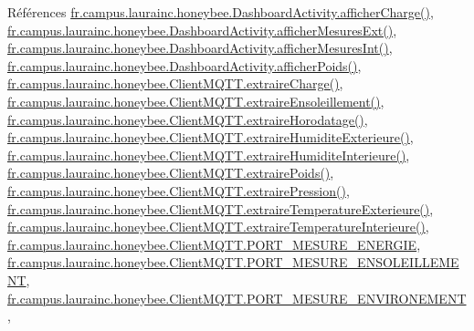 Références \hyperlink{classfr_1_1campus_1_1laurainc_1_1honeybee_1_1_dashboard_activity_a13e1d8016723e33b6245e9e3063c8a4f}{fr.\+campus.\+laurainc.\+honeybee.\+Dashboard\+Activity.\+afficher\+Charge()}, \hyperlink{classfr_1_1campus_1_1laurainc_1_1honeybee_1_1_dashboard_activity_afffb9de4776b6c6cea676a08251a58ba}{fr.\+campus.\+laurainc.\+honeybee.\+Dashboard\+Activity.\+afficher\+Mesures\+Ext()}, \hyperlink{classfr_1_1campus_1_1laurainc_1_1honeybee_1_1_dashboard_activity_aa177b8212619dec95e0a8eae4dbc867d}{fr.\+campus.\+laurainc.\+honeybee.\+Dashboard\+Activity.\+afficher\+Mesures\+Int()}, \hyperlink{classfr_1_1campus_1_1laurainc_1_1honeybee_1_1_dashboard_activity_a13786896440cb102e03bd5ac4f54c3d8}{fr.\+campus.\+laurainc.\+honeybee.\+Dashboard\+Activity.\+afficher\+Poids()}, \hyperlink{classfr_1_1campus_1_1laurainc_1_1honeybee_1_1_client_m_q_t_t_a93572795db92f79f417982f4785b71e0}{fr.\+campus.\+laurainc.\+honeybee.\+Client\+M\+Q\+T\+T.\+extraire\+Charge()}, \hyperlink{classfr_1_1campus_1_1laurainc_1_1honeybee_1_1_client_m_q_t_t_a38a76fc07a1793ba1a94898bdcd5ecbd}{fr.\+campus.\+laurainc.\+honeybee.\+Client\+M\+Q\+T\+T.\+extraire\+Ensoleillement()}, \hyperlink{classfr_1_1campus_1_1laurainc_1_1honeybee_1_1_client_m_q_t_t_ace17d633909a5be8035518b9a6b528c2}{fr.\+campus.\+laurainc.\+honeybee.\+Client\+M\+Q\+T\+T.\+extraire\+Horodatage()}, \hyperlink{classfr_1_1campus_1_1laurainc_1_1honeybee_1_1_client_m_q_t_t_a0a3be0588498643af9098ab70a7a837a}{fr.\+campus.\+laurainc.\+honeybee.\+Client\+M\+Q\+T\+T.\+extraire\+Humidite\+Exterieure()}, \hyperlink{classfr_1_1campus_1_1laurainc_1_1honeybee_1_1_client_m_q_t_t_ad7fd3fa1a51a608646b146765cfc4546}{fr.\+campus.\+laurainc.\+honeybee.\+Client\+M\+Q\+T\+T.\+extraire\+Humidite\+Interieure()}, \hyperlink{classfr_1_1campus_1_1laurainc_1_1honeybee_1_1_client_m_q_t_t_a390da1e77f256fd9d90093bfec544b55}{fr.\+campus.\+laurainc.\+honeybee.\+Client\+M\+Q\+T\+T.\+extraire\+Poids()}, \hyperlink{classfr_1_1campus_1_1laurainc_1_1honeybee_1_1_client_m_q_t_t_a630a29e060e4a0c2891cd79fad8d3585}{fr.\+campus.\+laurainc.\+honeybee.\+Client\+M\+Q\+T\+T.\+extraire\+Pression()}, \hyperlink{classfr_1_1campus_1_1laurainc_1_1honeybee_1_1_client_m_q_t_t_a5f9be292aa0e594c2f555f29abbb4fc9}{fr.\+campus.\+laurainc.\+honeybee.\+Client\+M\+Q\+T\+T.\+extraire\+Temperature\+Exterieure()}, \hyperlink{classfr_1_1campus_1_1laurainc_1_1honeybee_1_1_client_m_q_t_t_a92cd25872cdb04978a55ae166f858e0d}{fr.\+campus.\+laurainc.\+honeybee.\+Client\+M\+Q\+T\+T.\+extraire\+Temperature\+Interieure()}, \hyperlink{classfr_1_1campus_1_1laurainc_1_1honeybee_1_1_client_m_q_t_t_a423539a05c306ae52e5b6dc6fa6addc8}{fr.\+campus.\+laurainc.\+honeybee.\+Client\+M\+Q\+T\+T.\+P\+O\+R\+T\+\_\+\+M\+E\+S\+U\+R\+E\+\_\+\+E\+N\+E\+R\+G\+IE}, \hyperlink{classfr_1_1campus_1_1laurainc_1_1honeybee_1_1_client_m_q_t_t_a49b4a61b3c65f6b3a1786ef6eeeb15e2}{fr.\+campus.\+laurainc.\+honeybee.\+Client\+M\+Q\+T\+T.\+P\+O\+R\+T\+\_\+\+M\+E\+S\+U\+R\+E\+\_\+\+E\+N\+S\+O\+L\+E\+I\+L\+L\+E\+M\+E\+NT}, \hyperlink{classfr_1_1campus_1_1laurainc_1_1honeybee_1_1_client_m_q_t_t_a85b9107442e2f5ef6fd6bef732336d8e}{fr.\+campus.\+laurainc.\+honeybee.\+Client\+M\+Q\+T\+T.\+P\+O\+R\+T\+\_\+\+M\+E\+S\+U\+R\+E\+\_\+\+E\+N\+V\+I\+R\+O\+N\+E\+M\+E\+NT}, 